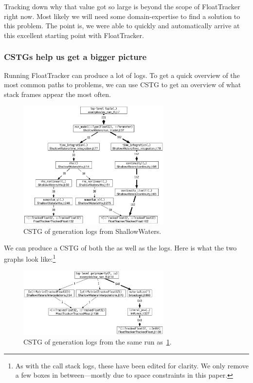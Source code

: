 \documentclass{juliacon}
\begin{document}
Tracking down why that value got so large is beyond the scope of FloatTracker right now.
Most likely we will need some domain-expertise to find a solution to this problem.
The point is, we were able to quickly and automatically arrive at this excellent starting point with FloatTracker.

\subsubsection{CSTGs help us get a bigger picture}

Running FloatTracker can produce a lot of logs.
To get a quick overview of the most common paths to problems, we can use CSTG to get an overview of what stack frames appear the most often.

\begin{figure}
  \centering
  \includegraphics[width=3in]{fig/sw_nan_cstg_clean.png}
  \caption{CSTG of \NaN{} generation logs from ShallowWaters.}
  \label{fig:sw_nan_cstg}
\end{figure}

We can produce a CSTG of both the \Inf{} as well as the \NaN{} logs.
Here is what the two graphs look like:\footnote{As with the call stack logs, these have been edited for clarity. We only remove a few boxes in between—mostly due to space constraints in this paper.}

\begin{figure}
  \centering
  \includegraphics[width=3in]{fig/sw_inf_cstg_clean.png}
  \caption{CSTG of \Inf{} generation logs from the same run as~\cref{fig:sw_nan_cstg}.}
  \label{fig:sw_inf_cstg}
\end{figure}
\end{document}
